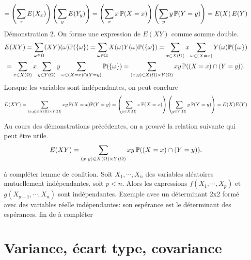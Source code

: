 \begin{demo}
\begin{multline*}
= \left(\sum_{x}E(X_x) \right) \left(\sum_{y} E(Y_y) \right)
= \left(\sum_{x}x\,\mathbb{P}(X=x) \right) \left(\sum_{y} y\,\mathbb{P}(Y=y) \right)
= E(X)\, E(Y)
\end{multline*}
Démonstration 2.\newline
On forme une expression de $E(XY)$ comme somme double.
\begin{multline*}
  E(XY) = \sum_{\omega \in \Omega} (XY)(\omega)\mathbb{P}(\left\lbrace\omega\right\rbrace)
= \sum_{\omega \in \Omega} X(\omega)Y(\omega)\mathbb{P}(\left\lbrace\omega\right\rbrace)
= \sum_{x\in X(\Omega)}x\sum_{\omega \in (X=x)}Y(\omega)\mathbb{P}(\left\lbrace\omega\right\rbrace) \\
= \sum_{x\in X(\Omega)}x\sum_{y\in Y(\Omega)}y \sum_{\omega \in (X=x)\cap(Y=y)}\mathbb{P}(\left\lbrace\omega\right\rbrace)
= \sum_{(x,y)\in X(\Omega)\times Y(\Omega)}xy\, \mathbb{P}((X=x)\cap(Y=y)).
\end{multline*}
Lorsque les variables sont indépendantes, on peut conclure
\begin{displaymath}
  E(XY) = \sum_{(x,y)\in X(\Omega)\times Y(\Omega)}xy\, \mathbb{P}(X=x)\mathbb{P}(Y=y)
  = \left( \sum_{x\in X(\Omega)}x\,\mathbb{P}(X=x)\right) \left( \sum_{y\in Y(\Omega)}y\,\mathbb{P}(Y=y)\right)
  = E(X)E(Y)
\end{displaymath}
\end{demo}
\begin{rem}
Au cours des démonstrations précédentes, on a prouvé la relation suivante qui peut être utile.
\[
 E(XY) = \sum_{(x,y)\in X(\Omega)\times Y(\Omega)}xy\, \mathbb{P}((X=x)\cap(Y=y)).
\]  
\end{rem}
à compléter
lemme de coalition. Soit $X_1,\cdots,X_n$ des variables aléatoires mutuellement indépendantes, soit $p < n$. Alors les expressions $f(X_1,\cdots,X_p)$ et $g(X_{p+1}, \cdots,X_n)$ sont indépendantes. Exemple avec un déterminant 2x2 formé avec des variables réelle indépendantes: son espérance est le déterminant des espérances.
fin de à compléter

\section{Variance, écart type, covariance}
